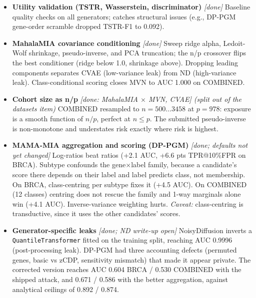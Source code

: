 \begin{itemize}
\item \textbf{Utility validation (TSTR, Wasserstein, discriminator)} \emph{[done]} Baseline quality checks on all generators; catches structural issues (e.g., DP-PGM gene-order scramble dropped TSTR-F1 to 0.092).
\item \textbf{MahalaMIA covariance conditioning} \emph{[done]} Sweep ridge alpha, Ledoit-Wolf shrinkage, pseudo-inverse, and PCA truncation; the n/p crossover flips the best conditioner (ridge below 1.0, shrinkage above). Dropping leading components separates CVAE (low-variance leak) from ND (high-variance leak). Class-conditional scoring closes MVN to AUC 1.000 on COMBINED.
\item \textbf{Cohort size as n/p} \emph{[done: MahalaMIA $\times$ MVN, CVAE] (split out of the datasets item)} COMBINED resampled to $n = 500 \ldots 3458$ at $p = 978$: exposure is a smooth function of $n/p$, perfect at $n \le p$. The submitted pseudo-inverse is non-monotone and understates risk exactly where risk is highest.
\item \textbf{MAMA-MIA aggregation and scoring (DP-PGM)} \emph{[done; defaults not yet changed]} Log-ratios beat ratios (+2.1 AUC, +6.6 pts TPR@10\%FPR on BRCA). Subtype confounds the gene$\times$label family, because a candidate's score there depends on their label and label predicts class, not membership. On BRCA, class-centring per subtype fixes it (+4.5 AUC). On COMBINED (12 classes) centring does not rescue the family and 1-way marginals alone win (+4.1 AUC). Inverse-variance weighting hurts. \emph{Caveat:} class-centring is transductive, since it uses the other candidates' scores.
\item \textbf{Generator-specific leaks} \emph{[done; ND write-up open]} NoisyDiffusion inverts a \texttt{QuantileTransformer} fitted on the training split, reaching AUC 0.9996 (post-processing leak). DP-PGM had three accounting defects (permuted genes, basic vs zCDP, sensitivity mismatch) that made it appear private. The corrected version reaches AUC 0.604 BRCA / 0.530 COMBINED with the shipped attack, and 0.671 / 0.586 with the better aggregation, against analytical ceilings of 0.892 / 0.874.
\end{itemize}

